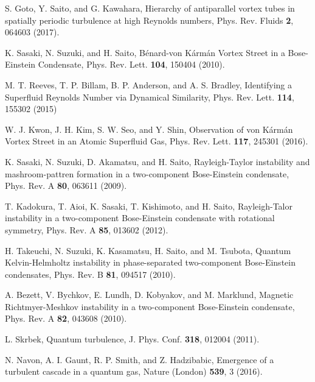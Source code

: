 \documentclass[aps,onecolumn,pra,longbibliography]{revtex4}
\begin{document}
\begin{thebibliography}{99}
		S. Goto, Y. Saito, and G. Kawahara,
		Hierarchy of antiparallel vortex tubes
		in spatially periodic turbulence at high Reynolds numbers,
		Phys. Rev. Fluids \textbf{2}, 064603 (2017).

		K. Sasaki, N. Suzuki, and H. Saito,
		B\'enard-von K\'arm\'an Vortex Street in a Bose-Einstein Condensate,
		Phys. Rev. Lett. \textbf{104}, 150404 (2010).

		M. T. Reeves, T. P. Billam, B. P. Anderson, and A. S. Bradley,
		Identifying a Superfluid Reynolds Number via Dynamical Similarity,
		Phys. Rev. Lett. \textbf{114}, 155302 (2015)

		W. J. Kwon, J. H. Kim, S. W. Seo, and Y. Shin,
		Observation of von K\'arm\'an Vortex Street in an Atomic Superfluid Gas,
		Phys. Rev. Lett. \textbf{117}, 245301 (2016).

		K. Sasaki, N. Suzuki, D. Akamatsu, and H. Saito,
		Rayleigh-Taylor instability and mashroom-pattren formation
		in a two-component Bose-Einstein condensate,
		Phys. Rev. A \textbf{80}, 063611 (2009).

		T. Kadokura, T. Aioi, K. Sasaki, T. Kishimoto, and H. Saito,
		Rayleigh-Talor instability in a two-component Bose-Einstein
		condensate with rotational symmetry,
		Phys. Rev. A \textbf{85}, 013602 (2012).

		H. Takeuchi, N. Suzuki, K. Kasamatsu, H. Saito, and M. Tsubota,
		Quantum Kelvin-Helmholtz instability in phase-separated
		two-component Bose-Einstein condensates,
		Phys. Rev. B \textbf{81}, 094517 (2010).

		A. Bezett, V. Bychkov, E. Lundh, D. Kobyakov, and M. Marklund,
		Magnetic Richtmyer-Meshkov instability in a two-component
		Bose-Einstein condensate,
		Phys. Rev. A \textbf{82}, 043608 (2010).

		L. Skrbek,
		Quantum turbulence,
		J. Phys. Conf. \textbf{318}, 012004 (2011).

		N. Navon, A. I. Gaunt, R. P. Smith, and Z. Hadzibabic,
		Emergence of a turbulent cascade in a quantum gas,
		Nature (London) \textbf{539}, 3 (2016).


\end{thebibliography}
\end{document}
